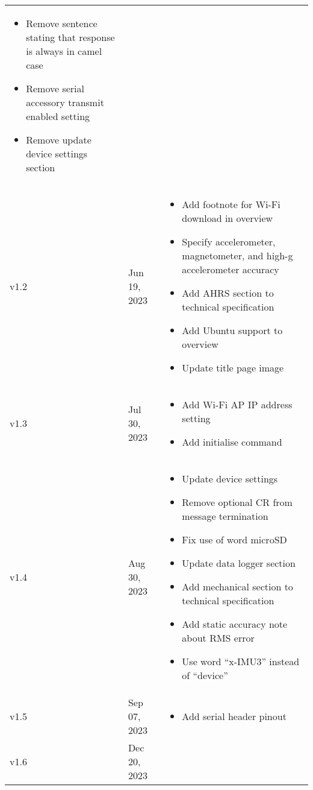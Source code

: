 \begin{longtable}{| >{\centering}p{} | p{} | >{\raggedright\arraybackslash}p{} |}
\begin{itemize}
        \item Remove sentence stating that response is always in camel case
        \item Remove serial accessory transmit enabled setting
        \item Remove update device settings section
    \end{itemize}\\
    v1.2 & Jun 19, 2023 &
    \begin{itemize}
        \item Add footnote for Wi-Fi download in overview
        \item Specify accelerometer, magnetometer, and high-g accelerometer accuracy
        \item Add AHRS section to technical specification
        \item Add Ubuntu support to overview
        \item Update title page image
    \end{itemize}\\
    v1.3 & Jul 30, 2023 &
    \begin{itemize}
        \item Add Wi-Fi \ac{AP} \ac{IP} address setting
        \item Add initialise command
    \end{itemize}\\
    v1.4 & Aug 30, 2023 &
    \begin{itemize}
        \item Update device settings
        \item Remove optional CR from message termination
        \item Fix use of word \ac{microSD}
        \item Update data logger section
        \item Add mechanical section to technical specification
        \item Add static accuracy note about \acs{RMS} error
        \item Use word \enquote{x-IMU3} instead of \enquote{device}
    \end{itemize}\\
    v1.5 & Sep 07, 2023 &
    \begin{itemize}
        \item Add serial header pinout
    \end{itemize}\\
    v1.6 & Dec 20, 2023 &
    \begin{itemize}

\end{itemize}
\end{longtable}
